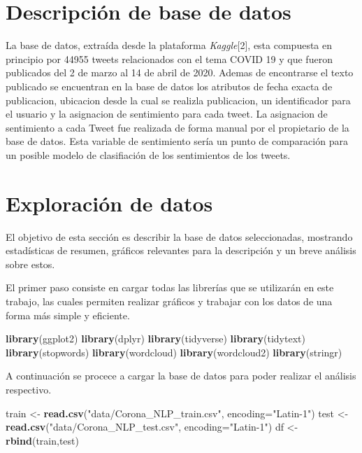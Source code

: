 \documentclass[
]{article}
\newenvironment{Shaded}{\begin{snugshade}}{\end{snugshade}}
\newcommand{\DataTypeTok}[1]{\textcolor[rgb]{0.13,0.29,0.53}{#1}}
\newcommand{\KeywordTok}[1]{\textcolor[rgb]{0.13,0.29,0.53}{\textbf{#1}}}
\newcommand{\NormalTok}[1]{#1}
\newcommand{\StringTok}[1]{\textcolor[rgb]{0.31,0.60,0.02}{#1}}
\begin{document}
\hypertarget{descripciuxf3n-de-base-de-datos}{%
\section{Descripción de base de
datos}\label{descripciuxf3n-de-base-de-datos}}

La base de datos, extraída desde la plataforma \emph{Kaggle}{[}2{]},
esta compuesta en principio por 44955 tweets relacionados con el tema
COVID 19 y que fueron publicados del 2 de marzo al 14 de abril de 2020.
Ademas de encontrarse el texto publicado se encuentran en la base de
datos los atributos de fecha exacta de publicacion, ubicacion desde la
cual se realizla publicacion, un identificador para el usuario y la
asignacion de sentimiento para cada tweet. La asignacion de sentimiento
a cada Tweet fue realizada de forma manual por el propietario de la base
de datos. Esta variable de sentimiento sería un punto de comparación
para un posible modelo de clasifiación de los sentimientos de los
tweets.

\hypertarget{exploraciuxf3n-de-datos}{%
\section{Exploración de datos}\label{exploraciuxf3n-de-datos}}

El objetivo de esta sección es describir la base de datos seleccionadas,
mostrando estadísticas de resumen, gráficos relevantes para la
descripción y un breve análisis sobre estos.

El primer paso consiste en cargar todas las librerías que se utilizarán
en este trabajo, las cuales permiten realizar gráficos y trabajar con
los datos de una forma más simple y eficiente.

\begin{Shaded}
\begin{Highlighting}[]
\KeywordTok{library}\NormalTok{(ggplot2)}
\KeywordTok{library}\NormalTok{(dplyr)}
\KeywordTok{library}\NormalTok{(tidyverse)}
\KeywordTok{library}\NormalTok{(tidytext)}
\KeywordTok{library}\NormalTok{(stopwords)}
\KeywordTok{library}\NormalTok{(wordcloud)}
\KeywordTok{library}\NormalTok{(wordcloud2)}
\KeywordTok{library}\NormalTok{(stringr)}
\end{Highlighting}
\end{Shaded}

A continuación se procece a cargar la base de datos para poder realizar
el análisis respectivo.

\begin{Shaded}
\begin{Highlighting}[]
\NormalTok{train  <-}\StringTok{ }\KeywordTok{read.csv}\NormalTok{(}\StringTok{"data/Corona_NLP_train.csv"}\NormalTok{, }\DataTypeTok{encoding=}\StringTok{"Latin-1"}\NormalTok{)}
\NormalTok{test <-}\StringTok{ }\KeywordTok{read.csv}\NormalTok{(}\StringTok{"data/Corona_NLP_test.csv"}\NormalTok{, }\DataTypeTok{encoding=}\StringTok{"Latin-1"}\NormalTok{)}
\NormalTok{df <-}\StringTok{ }\KeywordTok{rbind}\NormalTok{(train,test)}
\end{Highlighting}
\end{Shaded}
\end{document}
